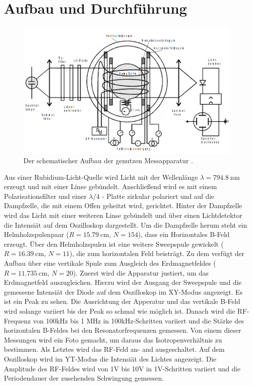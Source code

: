 \section{Aufbau und Durchführung}
\label{sec:Durchführung}

\begin{figure}
    \centering
    \includegraphics[width=\textwidth]{Fotos/aufbau.png}
    \caption{Der schematischer Aufbau der genutzen Messapparatur \cite{V21}.}
    \label{fig:aufbau}
\end{figure}

Aus einer Rubidium-Licht-Quelle wird Licht 
mit der Wellenlänge $\lambda = \qty{794.8}{\nano \meter}$ erzeugt 
und mit einer Linse gebündelt.
Anschließend wird es mit einem Polarisationsfilter 
und einer $\lambda / 4$ - Platte zirkular polariert
und auf die Dampfzelle, die mit einem Offen geheitzt wird, gerichtet.
Hinter der Dampfzelle wird das Licht mit einer weiteren Linse gebündelt 
und über einen Lichtdetektor die Intensiät auf dem Oszilloskop dargestellt.
Um die Dampfzelle herum steht ein Helmholzspulenpaar ($R=\qty{15.79}{\cm}$, $N=154$), 
dass ein Horizontales B-Feld erzeugt. 
Über den Helmholzspulen ist eine weitere Sweepspule gewickelt ($R=\qty{16.39}{\cm}$, $N=11$), 
die zum horizontalen Feld beisträgt.
Zu dem verfügt der Aufbau über eine vertikale Spule zum Ausgleich des Erdmagnetfeldes ($R=\qty{11.735}{\cm}$, $N=20$).
\newline \newline
\noindent Zuerst wird die Apparatur justiert, um das Erdmagnetfeld auszugleichen. 
Hierzu wird der Ausgang der Sweepspule und die gemessene Intensiät der Diode 
auf dem Oszilloskop im XY-Modus angezeigt.
Es ist ein Peak zu sehen.
Die Ausrichtung der Apperatur und das vertikale B-Feld wird solange variiert 
bis der Peak so schmal wie möglich ist.
\newline
\noindent Danach wird die RF-Frequenz von 100kHz bis 1 MHz in 100kHz-Schritten 
variiert und die Stärke des horizontalen B-Feldes bei den Resonatorfrequenzen gemessen.
Von einem dieser Messungen wird ein Foto gemacht, um daraus das Isotropenverhältnis zu bestimmen.
\newline
\noindent Als Letztes wird das RF-Feld an- and ausgeschaltet. 
Auf dem Oszilloskop wird im YT-Modus die Intensiät des Lichtes angezeigt.
Die Amplitude des RF-Feldes wird von 1V bis 10V in 1V-Schritten variiert 
und die Periodendauer der zusehenden Schwingung gemessen.

